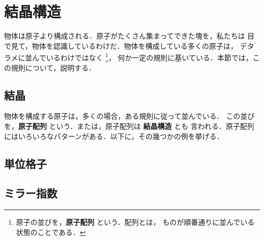 ﻿%
    \section{結晶構造}
        \begin{mycomment}
            物体は原子より構成される．原子がたくさん集まってできた塊を，私たちは
            目で見て，物体を認識しているわけだ．物体を構成している多くの原子は，
            デタラメに並んでいるわけではなく
                \footnote{
                    原子の並びを，\textbf{原子配列} という．配列とは，
                    ものが順番通りに並んでいる状態のことである．
                }，
            何か一定の規則に基いている．本節では，この規則について，説明する．
        \end{mycomment}

        \subsection{結晶}
            物体を構成する原子は，多くの場合，ある規則に従って並んでいる．
            この並びを，\textbf{原子配列} という．または，原子配列は \textbf{結晶構造} とも
            言われる．原子配列にはいろいろなパターンがある．以下に，その幾つかの例を挙げる．

        \subsection{単位格子}

        \subsection{ミラー指数}

